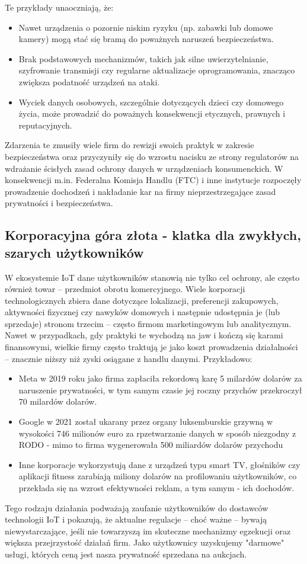 Te przykłady unaoczniają, że:
\begin{itemize}
\item Nawet urządzenia o pozornie niskim ryzyku (np. zabawki lub domowe kamery) mogą stać się bramą do poważnych naruszeń bezpieczeństwa.
\item Brak podstawowych mechanizmów, takich jak silne uwierzytelnianie, szyfrowanie transmisji czy regularne aktualizacje oprogramowania, znacząco zwiększa podatność urządzeń na ataki.
\item Wyciek danych osobowych, szczególnie dotyczących dzieci czy domowego życia, może prowadzić do poważnych konsekwencji etycznych, prawnych i reputacyjnych.
\end{itemize}

Zdarzenia te zmusiły wiele firm do rewizji swoich praktyk w zakresie bezpieczeństwa oraz przyczyniły się do wzrostu nacisku ze strony regulatorów na wdrażanie ścisłych zasad ochrony danych w urządzeniach konsumenckich. W konsekwencji m.in. Federalna Komisja Handlu (FTC) i inne instytucje rozpoczęły prowadzenie dochodzeń i nakładanie kar na firmy nieprzestrzegające zasad prywatności i bezpieczeństwa.

\subsection{Korporacyjna góra złota - klatka dla zwykłych, szarych użytkowników}
W ekosystemie IoT dane użytkowników stanowią nie tylko cel ochrony, ale często również towar – przedmiot obrotu komercyjnego. Wiele korporacji technologicznych zbiera dane dotyczące lokalizacji, preferencji zakupowych, aktywności fizycznej czy nawyków domowych i następnie udostępnia je (lub sprzedaje) stronom trzecim – często firmom marketingowym lub analitycznym. Nawet w przypadkach, gdy praktyki te wychodzą na jaw i kończą się karami finansowymi, wielkie firmy często traktują je jako koszt prowadzenia działalności – znacznie niższy niż zyski osiągane z handlu danymi. Przykładowo:
\begin{itemize}
    \item Meta w 2019 roku jako firma zapłaciła rekordową karę 5 milardów dolarów za naruszenie prywatności, w tym samym czasie jej roczny przychów przekroczył 70 milardów dolarów.
    \item Google w 2021 został ukarany przez organy luksemburskie grzywną w wysokości 746 milionów euro za rpzetwarzanie danych w sposób niezgodny z RODO - mimo to firma wygenerowała 500 miliardów dolarów przychodu
    \item Inne korporacje wykorzystują dane z urządzeń typu smart TV, głośników czy aplikacji fitness zarabiają miliony dolarów na profilowaniu użytkowników, co przekłada się na wzrost efektywności reklam, a tym samym - ich dochodów.
\end{itemize}
Tego rodzaju działania podważają zaufanie użytkowników do dostawców technologii IoT i pokazują, że aktualne regulacje – choć ważne – bywają niewystarczające, jeśli nie towarzyszą im skuteczne mechanizmy egzekucji oraz większa przejrzystość działań firm. Jako użytkownicy uzyskujemy "darmowe" usługi, których ceną jest nasza prywatność sprzedana na aukcjach.
